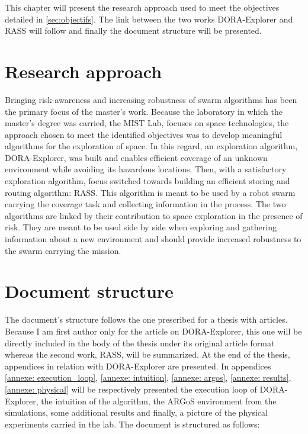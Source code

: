 \label{sec:approach}

This chapter will present the research approach used to meet the objectives detailed in \ref{sec:objectifs}. The link between the two works DORA-Explorer and RASS will follow and finally the document structure will be presented.

\section{Research approach}
Bringing risk-awareness and increasing robustness of swarm algorithms has been the primary focus of the master's work. Because the laboratory in which the master's degree was carried, the MIST Lab, focuses on space technologies, the approach chosen to meet the identified objectives was to develop meaningful algorithms for the exploration of space. In this regard, an exploration algorithm, DORA-Explorer, was built and enables efficient coverage of an unknown environment while avoiding its hazardous locations. Then, with a satisfactory exploration algorithm, focus switched towards building an efficient storing and routing algorithm: RASS. This algorithm is meant to be used by a robot swarm carrying the coverage task and collecting information in the process. The two algorithms are linked by their contribution to space exploration in the presence of risk. They are meant to be used side by side when exploring and gathering information about a new environment and should provide increased robustness to the swarm carrying the mission.

\section{Document structure}
The document's structure follows the one prescribed for a thesis with articles. Because I am first author only for the article on DORA-Explorer, this one will be directly included in the body of the thesis under its original article format whereas the second work, RASS, will be summarized. At the end of the thesis, appendices in relation with DORA-Explorer are presented. In appendices \ref{annexe: execution_loop}, \ref{annexe: intuition}, \ref{annexe: argos}, \ref{annexe: results}, \ref{annexe: physical} will be respectively presented the execution loop of DORA-Explorer, the intuition of the algorithm, the ARGoS environment from the simulations, some additional results and finally, a picture of the physical experiments carried in the lab. The document is structured as follows:

